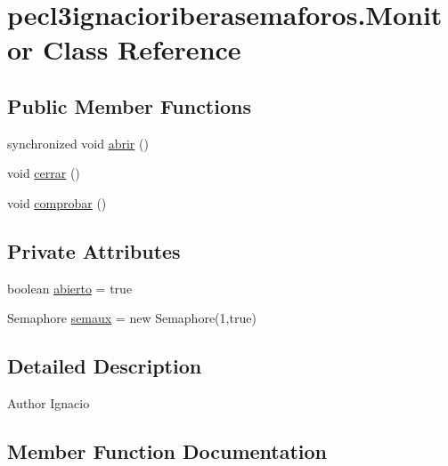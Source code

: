 \hypertarget{classpecl3ignacioriberasemaforos_1_1_monitor}{}\section{pecl3ignacioriberasemaforos.\+Monitor Class Reference}
\label{classpecl3ignacioriberasemaforos_1_1_monitor}
\subsection*{Public Member Functions}
\begin{DoxyCompactItemize}
\item 
synchronized void \mbox{\hyperlink{classpecl3ignacioriberasemaforos_1_1_monitor_a20de281e9dcdc5ce8f558e8ecc8f3138}{abrir}} ()
\item 
void \mbox{\hyperlink{classpecl3ignacioriberasemaforos_1_1_monitor_a7ff2d70abae6eea63a0eb96ffd1112df}{cerrar}} ()
\item 
void \mbox{\hyperlink{classpecl3ignacioriberasemaforos_1_1_monitor_a5bad35ef1f814400404e5e846db6a88f}{comprobar}} ()
\end{DoxyCompactItemize}
\subsection*{Private Attributes}
\begin{DoxyCompactItemize}
\item 
boolean \mbox{\hyperlink{classpecl3ignacioriberasemaforos_1_1_monitor_a45065f5df094d93eb9f369453e8ce5ec}{abierto}} = true
\item 
Semaphore \mbox{\hyperlink{classpecl3ignacioriberasemaforos_1_1_monitor_add0c5e8d57580a613d07b14abac72354}{semaux}} = new Semaphore(1,true)
\end{DoxyCompactItemize}


\subsection{Detailed Description}
\begin{DoxyAuthor}{Author}
Ignacio 
\end{DoxyAuthor}


\subsection{Member Function Documentation}
\mbox{\label{classpecl3ignacioriberasemaforos_1_1_monitor_a20de281e9dcdc5ce8f558e8ecc8f3138}} 
